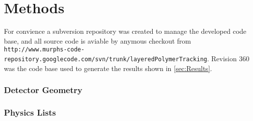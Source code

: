 \section{Methods}
\label{sec:Methods}

For convience a subversion repository was created to manage the developed code base, and all source code is aviable by anymous checkout from \verb+http://www.murphs-code-repository.googlecode.com/svn/trunk/layeredPolymerTracking+. Revision 360 was the code base used to generate the results shown in \ref{sec:Results}.

\subsubsection{Detector Geometry}

\subsubsection{Physics Lists}

